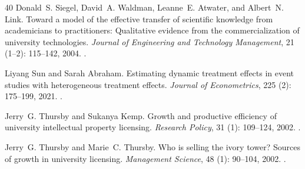 \begin{thebibliography}{40}
Donald~S. Siegel, David~A. Waldman, Leanne~E. Atwater, and Albert~N. Link.
\newblock Toward a model of the effective transfer of scientific knowledge from
  academicians to practitioners: Qualitative evidence from the
  commercialization of university technologies.
\newblock \emph{Journal of Engineering and Technology Management}, 21
  (1--2): 115--142, 2004.
\newblock {}.

Liyang Sun and Sarah Abraham.
\newblock Estimating dynamic treatment effects in event studies with
  heterogeneous treatment effects.
\newblock \emph{Journal of Econometrics}, 225 (2): 175--199,
  2021.
\newblock {}.

Jerry~G. Thursby and Sukanya Kemp.
\newblock Growth and productive efficiency of university intellectual property
  licensing.
\newblock \emph{Research Policy}, 31 (1): 109--124, 2002.
\newblock {}.

Jerry~G. Thursby and Marie~C. Thursby.
\newblock Who is selling the ivory tower? {Sources} of growth in university
  licensing.
\newblock \emph{Management Science}, 48 (1): 90--104, 2002.
\newblock {}.

\end{thebibliography}
